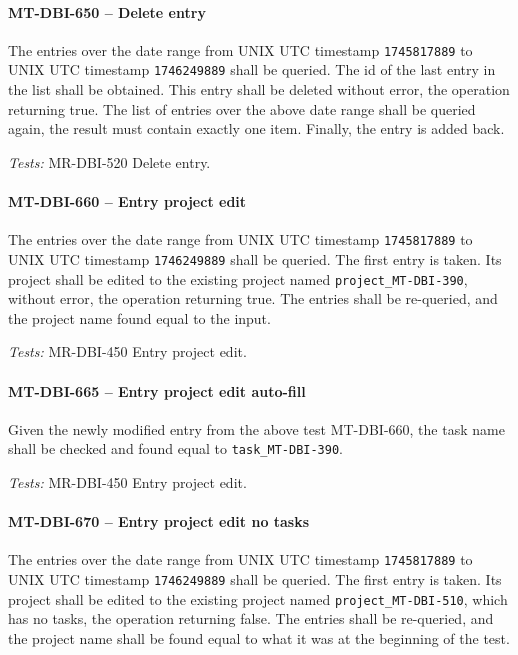 \paragraph{MT-DBI-650 -- Delete entry}
The entries over the date range from UNIX UTC timestamp
\lstinline{1745817889} to UNIX UTC timestamp \lstinline{1746249889}
shall be queried. The id of the last entry in the list shall
be obtained. This entry shall be deleted without error, the operation
returning true. The list of entries over the above date range
shall be queried again, the result must contain exactly one item.
Finally, the entry is added back.

\textit{Tests: } MR-DBI-520 Delete entry.

\paragraph{MT-DBI-660 -- Entry project edit}
The entries over the date range from UNIX UTC timestamp
\lstinline{1745817889} to UNIX UTC timestamp \lstinline{1746249889}
shall be queried. The first entry is taken.
Its project shall be edited to the existing project
named \lstinline{project_MT-DBI-390}, without error, the operation
returning true.
The entries shall be re-queried, and the project name found
equal to the input.

\textit{Tests: } MR-DBI-450 Entry project edit.

\paragraph{MT-DBI-665 -- Entry project edit auto-fill}
Given the newly modified entry from the above test MT-DBI-660,
the task name shall be checked and found equal to
\lstinline{task_MT-DBI-390}.

\textit{Tests: } MR-DBI-450 Entry project edit.

\paragraph{MT-DBI-670 -- Entry project edit no tasks}
The entries over the date range from UNIX UTC timestamp
\lstinline{1745817889} to UNIX UTC timestamp \lstinline{1746249889}
shall be queried. The first entry is taken.
Its project shall be edited to the existing project
named \lstinline{project_MT-DBI-510}, which has no tasks,
the operation returning false.
The entries shall be re-queried, and the project name shall be
found equal to what it was at the beginning of the test.


